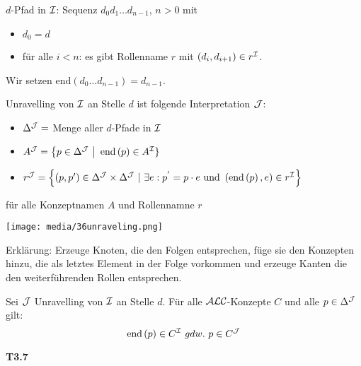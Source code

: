 $d$-Pfad in $\mathcal{I}$: Sequenz $d_{0}d_{1}\ldots d_{n - 1}$, $n > 0$ mit

\begin{itemize}
\item
  $d_{0} = d$
\item
  für alle $i < n$: es gibt Rollenname $r$ mit
  $\left( d_{i},d_{i + 1} \right) \in r^{\mathcal{I}}$.
\end{itemize}

Wir setzen
$\text{end}\left( d_{0}\ldots d_{n - 1} \right) = d_{n - 1}$.

\begin{definition}[Unravelling]

Unravelling von $\mathcal{I}$ an Stelle $d$ ist folgende Interpretation $\mathcal{J}$:

\begin{itemize}
\item
  $\Delta^{\mathcal{J}} =$ Menge aller $d$-Pfade in $\mathcal{I}$
\item
  $A^{\mathcal{J}} = \left\{ p \in \Delta^{\mathcal{J}}\  \right|\text{\ end}\left( p \right) \in A^{\mathcal{I}}\}$
\item
  $r^{\MJ} = \left\{ \left( p,p' \right) \in \Delta^{\MJ} \times \Delta^{\MJ}\ |\ \exists e:p^{'} = p \cdot e\ \mathrm{\text{und}}\ \left( \text{end}\left( p \right),e \right) \in r^{\MI} \right\}$
\end{itemize}

für alle Konzeptnamen $A$ und Rollennamne $r$
\end{definition}

\texttt{[image: media/36unraveling.png]}

Erklärung: Erzeuge Knoten, die den Folgen entsprechen, füge sie den
Konzepten hinzu, die als letztes Element in der Folge vorkommen und
erzeuge Kanten die den weiterführenden Rollen entsprechen.

\begin{lemma}\label{lemma37}
Sei $\mathcal{J}$ Unravelling von $\mathcal{I}$ an Stelle $d$. Für alle $\mathcal{A}\mathcal{L}\mathcal{C}$-Konzepte $C$ und alle $p \in \Delta^{\mathcal{J}}$ gilt:
$$\text{end}\left( p \right) \in C^{\MI}\ gdw.\ p \in C^{\MJ}$$
\end{lemma}

\textbf{T3.7}

